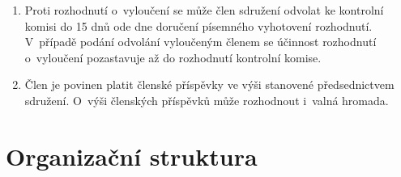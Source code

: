 \documentclass[a4paper]{article}
\begin{document}
\begin{enumerate}
    \item Proti rozhodnutí o~vyloučení se může člen sdružení odvolat ke
        kontrolní komisi do 15 dnů ode dne doručení písemného vyhotovení
        rozhodnutí. V~případě podání odvolání vyloučeným členem se účinnost
        rozhodnutí o~vyloučení pozastavuje až do rozhodnutí kontrolní komise.

    \item Člen je povinen platit členské příspěvky ve výši stanovené
        předsednictvem sdružení. O~výši členských příspěvků může rozhodnout
        i~valná hromada.
    \end{enumerate}



\section{Organizační struktura}
\end{document}
